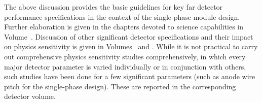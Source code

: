 The above discussion provides the basic guidelines for key far 
detector performance specifications in the context of the 
single-phase module design.  Further elaboration is given in the 
chapters devoted to science capabilities in 
Volume~\voltitlephysics{}.
Discussion of other significant detector specifications 
and their impact on 
physics sensitivity is given in Volumes~\voltitlesp{} and 
\voltitledp{}.  While it is not practical to carry out 
comprehensive physics sensitivity studies comprehensively, in 
which every major detector parameter is varied individually or 
in conjunction with others, such studies have been done 
for a few significant parameters (such as anode wire pitch for 
the single-phase \lartpc design).  These are reported in the 
corresponding detector volume.



